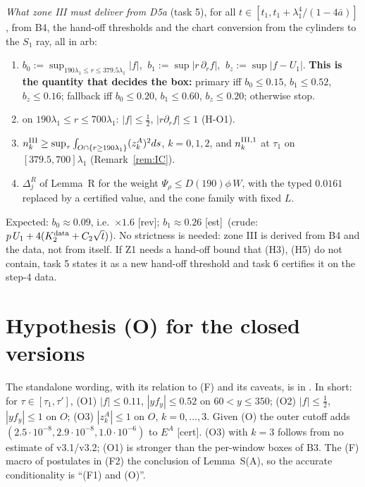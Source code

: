 \documentclass[11pt]{article}
\theoremstyle{definition}\newtheorem{definition}[theorem]{Definition}
\theoremstyle{remark}\newtheorem{remark}[theorem]{Remark}
\newcommand{\fn}[1]{\texttt{\detokenize{#1}}}
\newcommand{\tC}{\textup{[cert]}}\newcommand{\tE}{\textup{[est]}}\newcommand{\tP}{\textup{[paper]}}\newcommand{\tR}{\textup{[rev]}}
\begin{document}
\noindent\emph{What zone III must deliver from D5a} (task 5), for all $t\in[t_1,t_1+\lambda_1^4/(1-4\bar a)]$, from B4, the hand-off thresholds and the chart conversion from the cylinders to the $S_1$ ray, all in arb:
\begin{enumerate}[label=(Z\arabic*),leftmargin=2.4em,itemsep=2pt]
\item $b_0:=\sup_{190\lambda_1\le r\le379.5\lambda_1}|f|$, $\ b_1:=\sup|r\,\partial_rf|$, $\ b_z:=\sup|f-U_1|$. \textbf{This is the quantity that decides the box:} primary iff $b_0\le0.15$, $b_1\le0.52$, $b_z\le0.16$; fallback iff $b_0\le0.20$, $b_1\le0.60$, $b_z\le0.20$; otherwise stop.
\item on $190\lambda_1\le r\le700\lambda_1$: $|f|\le\frac12$, $|r\partial_rf|\le1$ (H-O1).
\item $n^{\rm III}_k\ge\sup_\tau\int_{O\cap\{r\ge190\lambda_1\}}(z^A_k)^2ds$, $k=0,1,2$, and $n^{{\rm III},1}_k$ at $\tau_1$ on $[379.5,700]\lambda_1$ (Remark~\ref{rem:IC}).
\item $\Delta^R_j$ of Lemma~R for the weight $\Psi_\rho\le D(190)\phi\,W$, with the typed $0.0161$ replaced by a certified value, and the cone family with fixed $L$.
\end{enumerate}
Expected: $b_0\approx0.09$, i.e.\ $\times1.6$ \tR; $b_1\approx0.26$ \tE\ (crude: $p\,U_1+4(K_2^{\rm data}+C_2\sqrt t)$). No strictness is needed: zone III is derived from B4 and the data, not from itself. If Z1 needs a hand-off bound that (H3), (H5) do not contain, task 5 states it as a new hand-off threshold and task 6 certifies it on the step-4 data.

\section{Hypothesis (O) for the closed versions}\label{sec:O}
The standalone wording, with its relation to (F) and its caveats, is in \fn{HYPOTHESIS_O.md}. In short: for $\tau\in[\tau_1,\tau']$, \textup{(O1)} $|f|\le0.11$, $|yf_y|\le0.52$ on $60<y\le350$; \textup{(O2)} $|f|\le\frac12$, $|yf_y|\le1$ on $O$; \textup{(O3)} $|z^A_k|\le1$ on $O$, $k=0,\dots,3$. Given (O) the outer cutoff adds $(2.5\cdot10^{-8},2.9\cdot10^{-8},1.0\cdot10^{-6})$ to $E^A$ \tC. (O3) with $k=3$ follows from no estimate of v3.1/v3.2; (O1) is stronger than the per-window boxes of B3. The (F) macro of \fn{main.tex} postulates in (F2) the conclusion of Lemma~S(A), so the accurate conditionality is ``(F1) and (O)''.
\end{document}
